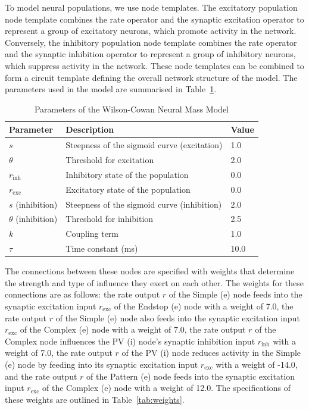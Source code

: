\documentclass[12pt]{article}
\begin{document}
To model neural populations, we use node templates. The excitatory population node template combines the rate operator and the synaptic excitation operator to represent a group of excitatory neurons, which promote activity in the network. Conversely, the inhibitory population node template combines the rate operator and the synaptic inhibition operator to represent a group of inhibitory neurons, which suppress activity in the network. These node templates can be combined to form a circuit template defining the overall network structure of the model. The parameters used in the model are summarised in Table~\ref{tab:parameters}.

\begin{table}[h]
  \centering
  \caption{Parameters of the Wilson-Cowan Neural Mass Model}
  \label{tab:parameters}
  \begin{tabular}{@{}lll@{}}
      \toprule
      \textbf{Parameter} & \textbf{Description} & \textbf{Value} \\ \midrule
      \( s \) & Steepness of the sigmoid curve (excitation) & 1.0 \\
      \( \theta \) & Threshold for excitation & 2.0 \\
      \( r_{\mathrm{inh}} \) & Inhibitory state of the population & 0.0 \\
      \( r_{\mathrm{exc}} \) & Excitatory state of the population & 0.0 \\
      \( s \) (inhibition) & Steepness of the sigmoid curve (inhibition) & 2.0 \\
      \( \theta \) (inhibition) & Threshold for inhibition & 2.5 \\
      \( k \) & Coupling term & 1.0 \\
      \( \tau \) & Time constant (ms) & 10.0 \\ \bottomrule
  \end{tabular}
\end{table}

The connections between these nodes are specified with weights that determine the strength and type of influence they exert on each other. The weights for these connections are as follows: the rate output \( r \) of the Simple (e) node feeds into the synaptic excitation input \( r_{\mathrm{exc}} \) of the Endstop (e) node with a weight of 7.0, the rate output \( r \) of the Simple (e) node also feeds into the synaptic excitation input \( r_{\mathrm{exc}} \) of the Complex (e) node with a weight of 7.0, the rate output \( r \) of the Complex node influences the PV (i) node's synaptic inhibition input \( r_{\mathrm{inh}} \) with a weight of 7.0, the rate output \( r \) of the PV (i) node reduces activity in the Simple (e) node by feeding into its synaptic excitation input \( r_{\mathrm{exc}} \) with a weight of -14.0, and the rate output \( r \) of the Pattern (e) node feeds into the synaptic excitation input \( r_{\mathrm{exc}} \) of the Complex (e) node with a weight of 12.0. The specifications of these weights are outlined in Table~\ref{tab:weights}.
\end{document}
